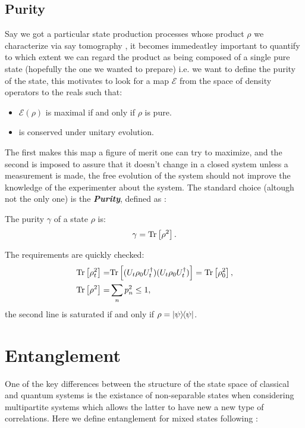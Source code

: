 \subsection{Purity}
Say we got a particular state production processes whose product $\rho$ we characterize via say tomography \cite{nielsen_quantum_2010}, it
becomes immedeatley important to quantify to which extent we can regard the product as being composed of a single pure state
(hopefully the one we wanted to prepare) i.e. we want to define the purity of the state, this motivates to look for a map
$\mathcal{E}$ from the space of density operators to the reals such that:
\begin{itemize}
        \item $\mathcal{E}(\rho)$ is maximal if and only if $\rho$ is pure.
        \item is conserved under unitary evolution.
\end{itemize}
The first makes this map a figure of merit one can try to maximize, and the second is imposed to assure that it doesn't change in a
closed system unless a measurement is made, the free evolution of the system should not improve the knowledge of the
experimenter about the system. The standard choice (altough not the only one) is the \textit{\textbf{Purity}},
defined as \cite{nielsen_quantum_2010, ballentine_quantum_2014}:
\begin{definition}
The purity $\gamma$ of a state $\rho$ is:
  \begin{equation}
    \gamma = \mathrm{Tr}\left[\rho^{2}\right].\label{eq:definition_purity}
  \end{equation}
\end{definition}
The requirements are quickly checked:
\begin{align}
  \mathrm{Tr}\left[\rho^{2}_{t}\right] =& \mathrm{Tr}\left[(U_{t}\rho_{0}U_{t}^{\dagger})(U_{t}\rho_{0}U_{t}^{\dagger})\right] = \mathrm{Tr}\left[\rho_{0}^{2}\right],\\
  \mathrm{Tr}\left[\rho^{2}\right] =& \sum_{n}p_{n}^{2} \leq 1,
\end{align}
the second line is saturated if and only if $\rho=\ketbra{\psi}$.
\section{Entanglement}
One of the key differences between the structure of the state space of classical and quantum systems is the existance
of non-separable states when considering multipartite systems \cite{reyes-lega_aspects_2015, diosi_short_2011,nielsen_quantum_2010,buchleitner2008entanglement} which allows
the latter to have new a new type of correlations. Here we define entanglement for mixed states following \cite{diosi_short_2011}:

